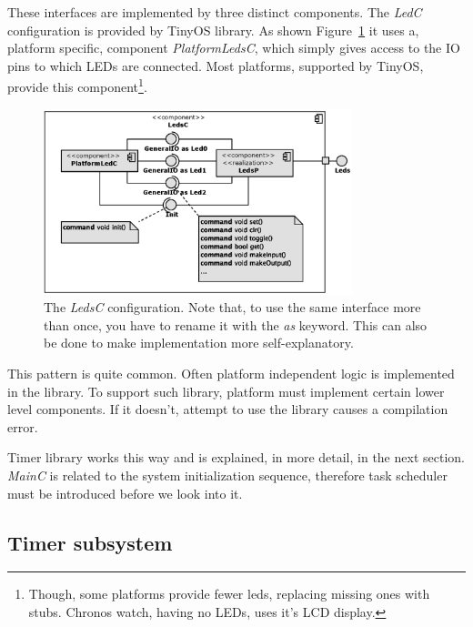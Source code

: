 These interfaces are implemented by three distinct components.
The \emph{LedC} configuration is provided by TinyOS library.
As shown Figure~\ref{fig:ledc} it uses a, platform specific, component
\emph{PlatformLedsC}, which simply gives access to the IO pins to
which LEDs are connected. Most platforms, supported by TinyOS, provide
this component\footnote{Though, some platforms provide fewer leds,
replacing missing ones with stubs. Chronos watch, having no LEDs,
uses it's LCD display.}.
\begin{figure}[h]
  \centering
  \includegraphics[width=0.8\textwidth]{diagrams/ledsc.eps}
  \caption{The \emph{LedsC} configuration. Note that, to use the same
  interface more than once, you have to rename it with the \emph{as}
  keyword.  This can also be done to make implementation more
  self-explanatory.}
  \label{fig:ledc}
\end{figure}

This pattern is quite common. Often platform independent logic is
implemented in the library. To support such library, platform must
implement certain lower level components.  If it doesn't, attempt to
use the library causes a compilation error.

Timer library works this way and is explained, in more detail, in the
next section. \emph{MainC} is related to the system initialization
sequence, therefore task scheduler must be introduced before we look into
it.

\subsection{Timer subsystem}

